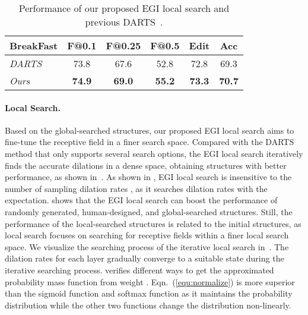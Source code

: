 \documentclass[final]{cvpr}
\renewcommand{\eqref}[1]{Eqn.~(\ref{#1})}
\newcommand{\myPara}[1]{\vspace{-.12in}\paragraph{#1}}
\newcommand{\tbf}[1]{\textbf{#1}}
\begin{document}
\begin{table}[t]
   \small
   \centering 
   \setlength{\tabcolsep}{2.5mm}
   \begin{tabular}{lccccc}  \toprule
   \tbf{BreakFast} 
   & F@0.1 & F@0.25 & F@0.5 & Edit  & Acc \\
   \midrule
   \textsl{DARTS}
   & 73.8 & 67.6 & 52.8 & 72.8 & 69.3  \\
   \textsl{Ours}
   & \tbf{74.9} & \tbf{69.0} & \tbf{55.2} & \tbf{73.3} & \tbf{70.7} \\
   \bottomrule 
   \end{tabular}
   \vspace{2pt}
   \caption{Performance of our proposed EGI local search and previous DARTS~\cite{liu2019darts}.} 
   \vspace{-10pt}
   \label{tab:ablation_das}
\end{table}




\myPara{Local Search.}
Based on the global-searched structures, our proposed EGI local search aims to fine-tune the receptive field in a 
finer search space. Compared with the DARTS~\cite{liu2019darts} method that only supports several search options, 
the EGI local search iteratively finds the accurate dilations in a dense space,
obtaining structures with better performance, as shown in~.
As shown in ,
EGI local search is insensitive to the number of sampling dilation rates ,
as it searches dilation rates with the expectation.
 shows that the EGI local search 
can boost the performance of randomly generated, human-designed, and global-searched structures.
Still, the performance of the local-searched structures is related to the initial structures,
as local search focuses on searching for receptive fields within a finer local search space.
We visualize the searching process of the iterative local search in~.
The dilation rates for each layer gradually converge to a suitable state during the iterative searching process.
 verifies different ways to get the approximated probability mass function 
 from
weight . \eqref{equ:normalize} is more superior than the sigmoid function and softmax function
as it maintains the probability distribution while the other two functions change the distribution non-linearly.
\end{document}
